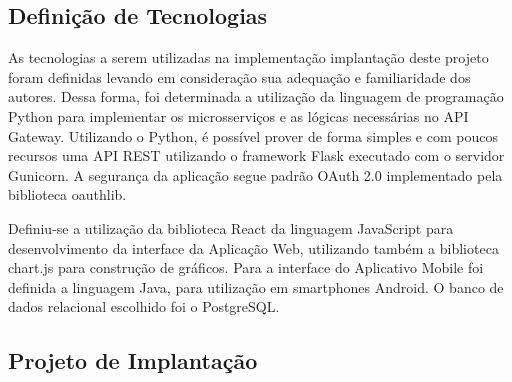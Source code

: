 \subsection{Definição de Tecnologias}

As tecnologias a serem utilizadas na implementação implantação deste projeto foram definidas levando em consideração sua adequação e familiaridade dos autores. Dessa forma, foi determinada a utilização da linguagem de programação Python para implementar os microsserviços e as lógicas necessárias no API Gateway. Utilizando o Python, é possível prover de forma simples e com poucos recursos uma API REST utilizando o framework Flask executado com o servidor Gunicorn. A segurança da aplicação segue padrão OAuth 2.0 implementado pela biblioteca oauthlib.

Definiu-se a utilização da biblioteca React da linguagem JavaScript para desenvolvimento da interface da Aplicação Web, utilizando também a biblioteca chart.js para construção de gráficos. Para a interface do Aplicativo Mobile foi definida a linguagem Java, para utilização em smartphones Android. O banco de dados relacional escolhido foi o PostgreSQL. 


\subsection{Projeto de Implantação}

